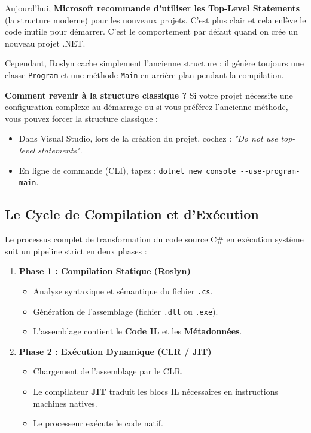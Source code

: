 \begin{tcolorbox}[colback=white,colframe=keywordcolor,title=\textbf{Quelle structure choisir et comment l'afficher ?}]
    Aujourd'hui, \textbf{Microsoft recommande d'utiliser les Top-Level Statements} (la structure moderne) pour les nouveaux projets. C'est plus clair et cela enlève le code inutile pour démarrer. C'est le comportement par défaut quand on crée un nouveau projet .NET.
    
    Cependant, Roslyn cache simplement l'ancienne structure : il génère toujours une classe \texttt{Program} et une méthode \texttt{Main} en arrière-plan pendant la compilation. 
    
    \textbf{Comment revenir à la structure classique ?}
    Si votre projet nécessite une configuration complexe au démarrage ou si vous préférez l'ancienne méthode, vous pouvez forcer la structure classique :
    \begin{itemize}
        \item Dans Visual Studio, lors de la création du projet, cochez : \emph{"Do not use top-level statements"}.
        \item En ligne de commande (CLI), tapez : \texttt{dotnet new console -{}-use-program-main}.
    \end{itemize}
\end{tcolorbox}

\subsection{Le Cycle de Compilation et d'Exécution}

Le processus complet de transformation du code source C\# en exécution système suit un pipeline strict en deux phases :

\begin{enumerate}
    \item \textbf{Phase 1 : Compilation Statique (Roslyn)}
    \begin{itemize}
        \item Analyse syntaxique et sémantique du fichier \texttt{.cs}.
        \item Génération de l'assemblage (fichier \texttt{.dll} ou \texttt{.exe}).
        \item L'assemblage contient le \textbf{Code IL} et les \textbf{Métadonnées}.
    \end{itemize}

    \item \textbf{Phase 2 : Exécution Dynamique (CLR / JIT)}
    \begin{itemize}
        \item Chargement de l'assemblage par le CLR.
        \item Le compilateur \textbf{JIT} traduit les blocs IL nécessaires en instructions machines natives.
        \item Le processeur exécute le code natif.
    \end{itemize}
\end{enumerate}

